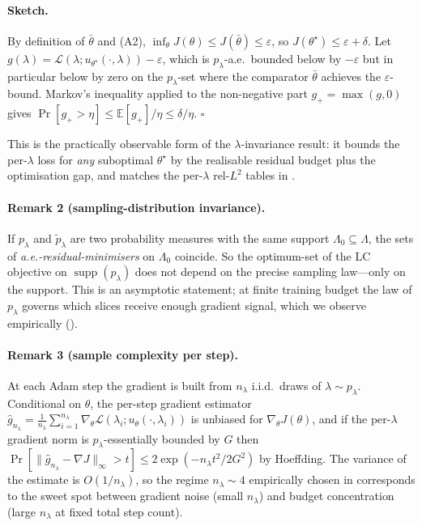 \paragraph{Sketch.}
By definition of $\bar\theta$ and (A2),
$\inf_\theta J(\theta) \le J(\bar\theta) \le \varepsilon$, so
$J(\theta^\star) \le \varepsilon + \delta$. Let
$g(\lambda) = \mathcal{L}(\lambda; u_{\theta^\star}(\cdot,\lambda)) -
\varepsilon$, which is $p_\lambda$-a.e.\ bounded below by
$-\varepsilon$ but in particular below by zero on the
$p_\lambda$-set where the comparator $\bar\theta$ achieves the
$\varepsilon$-bound. Markov's inequality applied to the
non-negative part $g_+ = \max(g, 0)$ gives
$\Pr[g_+ > \eta] \le \mathbb{E}[g_+]/\eta \le \delta/\eta$.
\hfill$\square$

This is the practically observable form of the
$\lambda$-invariance result: it bounds the per-$\lambda$ loss for
\emph{any} suboptimal $\theta^\star$ by the realisable residual
budget plus the optimisation gap, and matches the per-$\lambda$
rel-$L^2$ tables in .

\paragraph{Remark 2 (sampling-distribution invariance).}
If $p_\lambda$ and $\tilde p_\lambda$ are two probability measures
with the same support $\Lambda_0 \subseteq \Lambda$, the sets of
\emph{a.e.-residual-minimisers} on $\Lambda_0$ coincide. So the
optimum-set of the LC objective on $\operatorname{supp}(p_\lambda)$
does not depend on the precise sampling law---only on the support.
This is an asymptotic statement; at finite training budget the law
of $p_\lambda$ governs which slices receive enough gradient signal,
which we observe empirically ().

\paragraph{Remark 3 (sample complexity per step).}
\label{rem:sample}
At each Adam step the gradient is built from $n_\lambda$ i.i.d.\
draws of $\lambda \sim p_\lambda$. Conditional on $\theta$, the
per-step gradient estimator
$\hat g_{n_\lambda} = \frac{1}{n_\lambda}\sum_{i=1}^{n_\lambda}
\nabla_\theta \mathcal{L}(\lambda_i; u_\theta(\cdot,\lambda_i))$
is unbiased for $\nabla_\theta J(\theta)$, and if the per-$\lambda$
gradient norm is $p_\lambda$-essentially bounded by $G$ then
$\Pr[\| \hat g_{n_\lambda} - \nabla J \|_\infty > t] \le
2 \exp(-n_\lambda t^2 / 2 G^2)$ by Hoeffding. The variance of the
estimate is $O(1/n_\lambda)$, so the regime $n_\lambda \!\sim\! 4$
empirically chosen in \Cref{sec:results-ablations} corresponds to
the sweet spot between gradient noise (small $n_\lambda$) and
budget concentration (large $n_\lambda$ at fixed total step count).
